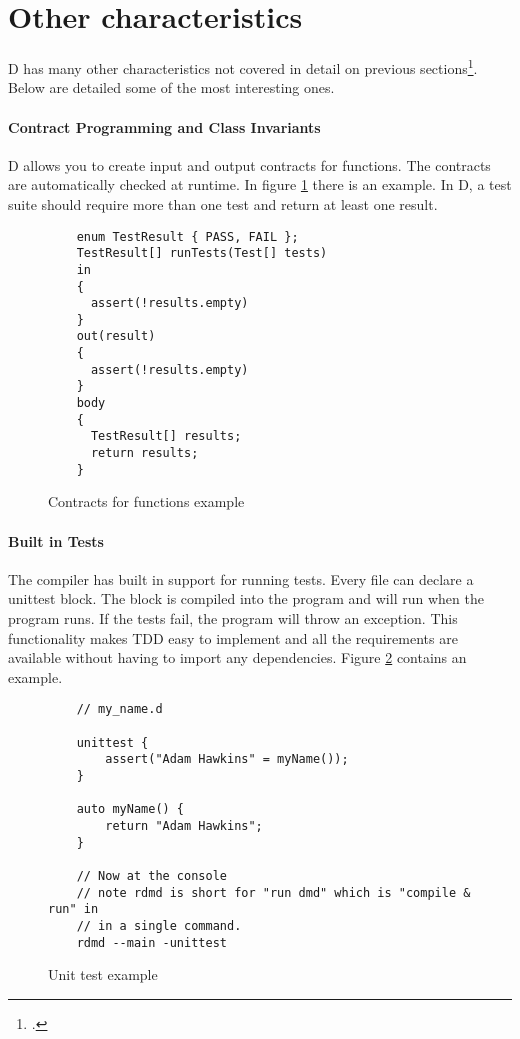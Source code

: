 \section{Other characteristics} \label{sec:other_characteristics}

D has many other characteristics not covered in detail on previous sections\footcite{excited_about_d}. Below are detailed some of the most interesting ones.

\paragraph{Contract Programming and Class Invariants}

D allows you to create input and output contracts for functions. The contracts are automatically checked at runtime. In figure \ref{fig:contract_code_example} there is an example. In D, a test suite should require more than one test and return at least one result.

\begin{figure}
  \caption{Contracts for functions example}
  \label{fig:contract_code_example}
  \begin{lstlisting}
    enum TestResult { PASS, FAIL };
    TestResult[] runTests(Test[] tests)
    in
    {
      assert(!results.empty)
    }
    out(result)
    {
      assert(!results.empty)
    }
    body
    {
      TestResult[] results;
      return results;
    }
  \end{lstlisting}
\end{figure}

\paragraph{Built in Tests}

The compiler has built in support for running tests. Every file can declare a unittest block. The block is compiled into the program and will run when the program runs. If the tests fail, the program will throw an exception. This functionality makes TDD easy to implement and all the requirements are available without having to import any dependencies. Figure \ref{fig:unit_test_code_example} contains an example.

\begin{figure}
  \caption{Unit test example}
  \label{fig:unit_test_code_example}
  \begin{lstlisting}
    // my_name.d

    unittest {
        assert("Adam Hawkins" = myName());
    }

    auto myName() {
        return "Adam Hawkins";
    }

    // Now at the console
    // note rdmd is short for "run dmd" which is "compile & run" in
    // in a single command.
    rdmd --main -unittest
  \end{lstlisting}
\end{figure}

